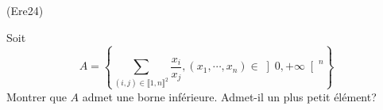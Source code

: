 \begin{tiny}(Ere24)\end{tiny} Soit
\[
 A = \left\lbrace \sum_{(i,j)\in\llbracket 1,n \rrbracket^2 } \frac{x_i}{x_j}, (x_1,\cdots,x_n)\in \left] 0, +\infty\right[^n \right\rbrace 
\]
Montrer que $A$ admet une borne inférieure. Admet-il un plus petit élément?